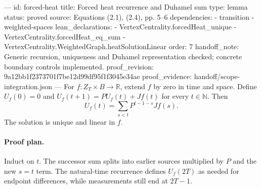 ---
id: forced-heat
title: Forced heat recurrence and Duhamel sum
type: lemma
status: proved
source: Equations (2.1), (2.4), pp. 5–6
dependencies:
- transition
- weighted-spaces
lean_declarations:
- VertexCentrality.forcedHeat_unique
- VertexCentrality.forcedHeat_eq_sum
- VertexCentrality.WeightedGraph.heatSolutionLinear
order: 7
handoff_note: Generic recursion, uniqueness and Duhamel representation checked; concrete boundary controls implemented.
proof_revision: 9a12bb1f2373701f7be12d99df95f1f3045e34ae
proof_evidence: handoff/scope-integration.json
---
For $f:Z_T\times B\to\mathbb R$, extend $f$ by zero in time and space. Define $U_f(0)=0$ and $U_f(t+1)=PU_f(t)+Jf(t)$ for every $t\in\mathbb N$. Then \[U_f(t)=\sum_{s<t}P^{t-1-s}Jf(s).\] The solution is unique and linear in $f$.

\paragraph{Proof plan.}
Induct on $t$. The successor sum splits into earlier sources multiplied by $P$ and the new $s=t$ term. The natural-time recurrence defines $U_f(2T)$ as needed for endpoint differences, while measurements still end at $2T-1$.
